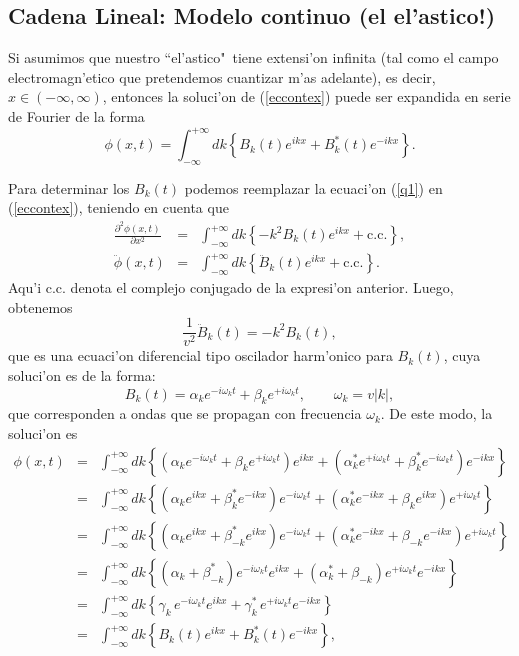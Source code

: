 \subsection{Cadena Lineal: Modelo continuo  (el el'astico!)}\label{seccon}

Si asumimos que nuestro ``el'astico"\ tiene extensi'on infinita (tal como el
campo
electromagn'etico que pretendemos cuantizar m'as adelante), es decir, $x\in
(-\infty,\infty)$, entonces la soluci'on de (\ref{eccontex}) puede ser expandida
en serie
de Fourier de la forma
\begin{equation}
\phi(x,t) =\int_{-\infty}^{+\infty} dk\left\{ B_k(t) e^{ikx}
+B_k^{\ast}(t) e^{-ikx}\right\} .\label{q1}
\end{equation}

Para determinar los $B_k(t) $  podemos reemplazar
la ecuaci'on (\ref{q1}) en (\ref{eccontex}), teniendo en cuenta que
\begin{eqnarray}
\frac{\partial^{2}\phi(x,t) }{\partial x^{2}} & = &\int_{-\infty}^{+\infty}
dk\left\{
-k^{2}B_k(t) e^{ikx}+\text{c.c.}\right\}, \\
\ddot{\phi}(x,t)& = &\int_{-\infty}^{+\infty} dk\left\{\ddot{B}_k(t)
e^{ikx}+\text{c.c.}\right\} .
\end{eqnarray}
Aqu'i c.c. denota el complejo conjugado de la expresi'on anterior. Luego, obtenemos
\begin{equation}
\frac{1}{v^{2}}\ddot{B}_k(t) =-k^{2}B_k(t) ,
\end{equation}
que es una ecuaci'on diferencial tipo oscilador harm'onico para $B_k(t)$, cuya
soluci'on es de la forma:
\begin{equation}
B_k(t) =\alpha_ke^{-i\omega_kt}+\beta_ke^{+i\omega_kt} ,\qquad \omega_k=v|k| ,
\end{equation}
que corresponden a ondas que se propagan con frecuencia $\omega_k$. De este
modo, la soluci'on es
\begin{eqnarray}
\phi(x,t) &=&\int_{-\infty}^{+\infty} dk\left\{ \left(
\alpha_ke^{-i\omega_kt}+\beta_ke^{+i\omega_kt}\right)  e^{ikx}+\left(
\alpha^*_ke^{+i\omega_kt}+\beta^*_ke^{-i\omega_kt}\right)  e^{-ikx}\right\} \\
&=&\int_{-\infty}^{+\infty} dk\left\{\left(\alpha_ke^{ikx}
+\beta^*_ke^{-ikx}\right) e^{-i\omega_kt}
+\left(\alpha^*_ke^{-ikx} +\beta_ke^{ikx}\right) e^{+i\omega_kt}\right\}\\
&=&\int_{-\infty}^{+\infty} dk\left\{\left(\alpha_ke^{ikx}
+\beta^*_{-k}e^{ikx}\right) e^{-i\omega_kt}
+\left(\alpha^*_ke^{-ikx} +\beta_{-k}e^{-ikx}\right) e^{+i\omega_kt}\right\}\\
&=&\int_{-\infty}^{+\infty} dk\left\{\left(\alpha_k +\beta^*_{-k}\right)
e^{-i\omega_kt} e^{ikx}
+\left(\alpha^*_k +\beta_{-k}\right) e^{+i\omega_kt}e^{-ikx}\right\}\\
&=&\int_{-\infty}^{+\infty} dk\left\{\gamma_k\, e^{-i\omega_kt} e^{ikx}
+\gamma_k^*\, e^{+i\omega_kt}e^{-ikx}\right\}\\
&=&\int_{-\infty}^{+\infty} dk\left\{B_k(t) e^{ikx}+B_k^*(t)e^{-ikx}\right\},
\label{soll}
\end{eqnarray}

